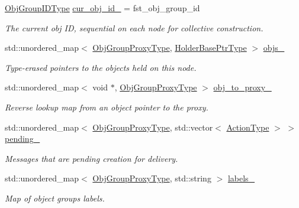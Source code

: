 \begin{DoxyCompactItemize}
\item 
\hyperlink{namespacevt_1_1objgroup_a54a50ff6833bf618e5bedb9a3b6d0e07}{Obj\+Group\+I\+D\+Type} \hyperlink{structvt_1_1objgroup_1_1_obj_group_manager_adcd7f8fcd4a9001b8fbd6e6a2a6447c9}{cur\+\_\+obj\+\_\+id\+\_\+} = fst\+\_\+obj\+\_\+group\+\_\+id
\begin{DoxyCompactList}\small\item\em The current obj ID, sequential on each node for collective construction. \end{DoxyCompactList}\item 
std\+::unordered\+\_\+map$<$ \hyperlink{namespacevt_ad7cae989df485fccca57f0792a880a8e}{Obj\+Group\+Proxy\+Type}, \hyperlink{structvt_1_1objgroup_1_1_obj_group_manager_ac1e9bb19d4a5923dd6d595bad28f04c9}{Holder\+Base\+Ptr\+Type} $>$ \hyperlink{structvt_1_1objgroup_1_1_obj_group_manager_abe842c221e7d99494a2323d4584428db}{objs\+\_\+}
\begin{DoxyCompactList}\small\item\em Type-\/erased pointers to the objects held on this node. \end{DoxyCompactList}\item 
std\+::unordered\+\_\+map$<$ void $\ast$, \hyperlink{namespacevt_ad7cae989df485fccca57f0792a880a8e}{Obj\+Group\+Proxy\+Type} $>$ \hyperlink{structvt_1_1objgroup_1_1_obj_group_manager_a3e20b6ad2329b8e8fa11027320730b42}{obj\+\_\+to\+\_\+proxy\+\_\+}
\begin{DoxyCompactList}\small\item\em Reverse lookup map from an object pointer to the proxy. \end{DoxyCompactList}\item 
std\+::unordered\+\_\+map$<$ \hyperlink{namespacevt_ad7cae989df485fccca57f0792a880a8e}{Obj\+Group\+Proxy\+Type}, std\+::vector$<$ \hyperlink{namespacevt_ae0a5a7b18cc99d7b732cb4d44f46b0f3}{Action\+Type} $>$ $>$ \hyperlink{structvt_1_1objgroup_1_1_obj_group_manager_a5678a768bddd808a3b39d96e6843c81d}{pending\+\_\+}
\begin{DoxyCompactList}\small\item\em Messages that are pending creation for delivery. \end{DoxyCompactList}\item 
std\+::unordered\+\_\+map$<$ \hyperlink{namespacevt_ad7cae989df485fccca57f0792a880a8e}{Obj\+Group\+Proxy\+Type}, std\+::string $>$ \hyperlink{structvt_1_1objgroup_1_1_obj_group_manager_a9732b303116ebf05972ba319d79f9ac6}{labels\+\_\+}
\begin{DoxyCompactList}\small\item\em Map of object groups\textquotesingle{} labels. \end{DoxyCompactList}\end{DoxyCompactItemize}
